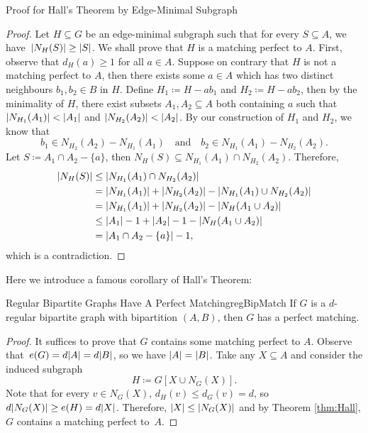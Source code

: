 \documentclass[math]{amznotes}
\theoremstyle{remark}
\begin{document}
\begin{genbox}{Proof for Hall's Theorem by Edge-Minimal Subgraph}
    \begin{proof}
        Let $H \subseteq G$ be an edge-minimal subgraph such that for every $S \subseteq A$, we have~${\left\lvert {N_H(S)} \right\rvert} \geq {\left\lvert {S} \right\rvert}$. We shall prove that $H$ is a matching perfect to $A$. First, observe that $d_H(a) \geq 1$ for all $a \in A$. Suppose on contrary that $H$ is not a matching perfect to $A$, then there exists some $a \in A$ which has two distinct neighbours $b_1, b_2 \in B$ in $H$. Define $H_1 \coloneqq H - ab_1$ and $H_2 \coloneqq H - ab_2$, then by the minimality of $H$, there exist subsets $A_1, A_2 \subseteq A$ both containing $a$ such that~${\left\lvert {N_{H_1}(A_1)} \right\rvert} < {\left\lvert {A_1} \right\rvert}$ and ${\left\lvert {N_{H_2}(A_2)} \right\rvert} < {\left\lvert {A_2} \right\rvert}$. By our construction of $H_1$ and $H_2$, we know that 
        \begin{equation*}
            b_1 \in N_{H_2}(A_2) - N_{H_1}(A_1) \quad\textrm{and}\quad b_2 \in N_{H_1}(A_1) - N_{H_2}(A_2).
        \end{equation*}
        Let $S \coloneqq A_1 \cap A_2 - \{a\}$, then $N_H(S) \subseteq N_{H_1}(A_1) \cap N_{H_2}(A_2)$. Therefore,
        \begin{align*}
            {\left\lvert {N_H(S)} \right\rvert} & \leq {\left\lvert {N_{H_1}(A_1) \cap N_{H_2}(A_2)} \right\rvert} \\
            & = {\left\lvert {N_{H_1}(A_1)} \right\rvert} + {\left\lvert {N_{H_2}(A_2)} \right\rvert} - {\left\lvert {N_{H_1}(A_1) \cup N_{H_2}(A_2)} \right\rvert} \\
            & = {\left\lvert {N_{H_1}(A_1)} \right\rvert} + {\left\lvert {N_{H_2}(A_2)} \right\rvert} - {\left\lvert {N_{H}(A_1 \cup A_2)} \right\rvert} \\
            & \leq {\left\lvert {A_1} \right\rvert} - 1 + {\left\lvert {A_2} \right\rvert} - 1 - {\left\lvert {N_{H}(A_1 \cup A_2)} \right\rvert} \\
            & = {\left\lvert {A_1 \cap A_2 - \{a\}} \right\rvert} - 1,
        \end{align*}
        which is a contradiction.
    \end{proof}
\end{genbox}
Here we introduce a famous corollary of Hall's Theorem:
\begin{corbox}{Regular Bipartite Graphs Have A Perfect Matching}{regBipMatch}
    If $G$ is a $d$-regular bipartite graph with bipartition $(A, B)$, then $G$ has a perfect matching.
    \tcblower
    \begin{proof}
        It suffices to prove that $G$ contains some matching perfect to $A$. Observe that~$e(G) = d{\left\lvert {A} \right\rvert} = d{\left\lvert {B} \right\rvert}$, so we have ${\left\lvert {A} \right\rvert} = {\left\lvert {B} \right\rvert}$. Take any $X \subseteq A$ and consider the induced subgraph 
        \begin{equation*}
            H \coloneqq G[X \cup N_G(X)].
        \end{equation*}
        Note that for every $v \in N_G(X)$, $d_H(v) \leq d_G(v) = d$, so $d{\left\lvert {N_G(X)} \right\rvert} \geq e(H) = d{\left\lvert {X} \right\rvert}$. Therefore, ${\left\lvert {X} \right\rvert} \leq {\left\lvert {N_G(X)} \right\rvert}$ and by Theorem \ref{thm:Hall}, $G$ contains a matching perfect to~$A$.
    \end{proof}
\end{corbox}
\end{document}
